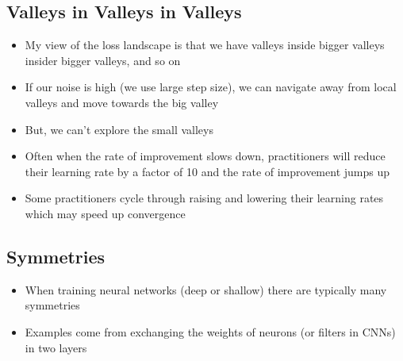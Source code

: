 
\begin{slide}
\section{Valleys in Valleys in Valleys}

\begin{PauseHighLight}
  \begin{itemize}
  \item My view of the loss landscape is that we have valleys inside
    bigger valleys insider bigger valleys, and so on\pause
  \item If our noise is high (we use large step size), we can navigate
    away from local valleys and move towards the big valley\pause
  \item But, we can't explore the small valleys\pause
  \item Often when the rate of improvement slows down, practitioners
    will reduce their learning rate by a factor of 10 and the rate of
    improvement jumps up\pause
  \item Some practitioners cycle through raising and lowering their
    learning rates which may speed up convergence\pause
  \end{itemize}
\end{PauseHighLight}

\end{slide}


\begin{slide}
\section[-2]{Symmetries}

\pb
\begin{itemize}
\item When training neural networks (deep or shallow) there are
  typically many symmetries\pauseh
\item Examples come from exchanging the weights of neurons (or
  filters in CNNs) in two layers\pauseh
  \begin{center}
    \pause
  \end{center}
\end{itemize}

\end{slide}

